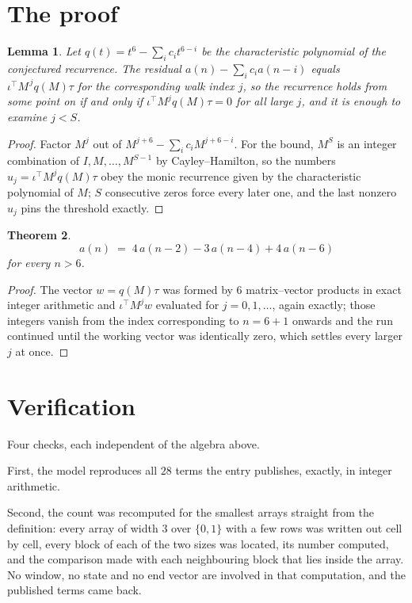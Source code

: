 \documentclass[11pt,a4paper]{article}
\theoremstyle{plain}
\newtheorem{theorem}{Theorem}
\newtheorem{lemma}[theorem]{Lemma}
\theoremstyle{definition}
\begin{document}
\section{The proof}

\begin{lemma}\label{lem:crit}
Let $q(t)=t^{6}-\sum_i c_it^{6-i}$ be the characteristic polynomial of the
conjectured recurrence. The residual $a(n)-\sum_ic_ia(n-i)$ equals
$\iota^{\!\top}M^{\,j}q(M)\tau$ for the corresponding walk index $j$, so the recurrence
holds from some point on if and only if $\iota^{\!\top}M^{j}q(M)\tau=0$ for all large $j$,
and it is enough to examine $j<S$.
\end{lemma}

\begin{proof}
Factor $M^{j}$ out of $M^{j+6}-\sum_ic_iM^{j+6-i}$. For the bound, $M^{S}$
is an integer combination of $I,M,\dots,M^{S-1}$ by Cayley--Hamilton, so the numbers
$u_j=\iota^{\!\top}M^{j}q(M)\tau$ obey the monic recurrence given by the characteristic
polynomial of $M$; $S$ consecutive zeros force every later one, and the last nonzero $u_j$
pins the threshold exactly.
\end{proof}

\begin{theorem}
\[
a(n)\;=\;4\,a(n-2) - 3\,a(n-4) + 4\,a(n-6)
\]
for every $n>6$.
\end{theorem}

\begin{proof}
The vector $w=q(M)\tau$ was formed by $6$ matrix--vector products in exact integer
arithmetic and $\iota^{\!\top}M^{j}w$ evaluated for $j=0,1,\dots$, again exactly; those
integers vanish from the index corresponding to $n=6+1$ onwards and the run continued
until the working vector was identically zero, which settles every larger $j$ at once.
\end{proof}

\section{Verification}

Four checks, each independent of the algebra above.

First, the model reproduces all $28$ terms the entry publishes, exactly, in integer
arithmetic.

Second, the count was recomputed for the smallest arrays straight from the definition: every
array of width $3$ over $\{0,1\}$ with a few rows was written out cell by cell, every block of
each of the two sizes was located, its number computed, and the comparison made with each neighbouring block
that lies inside the array. No window, no state and no end vector are involved in that
computation, and the published terms came back.
\end{document}
